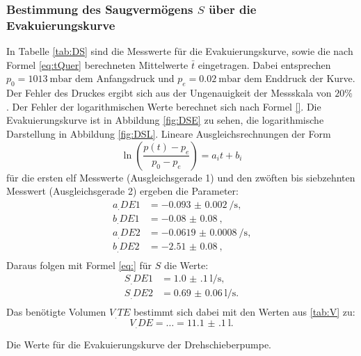 \subsubsection{Bestimmung des Saugvermögens $S$ über die Evakuierungskurve}

In Tabelle \ref{tab:DS} sind die Messwerte für die Evakuierungskurve, sowie die nach Formel \eqref{eq:tQuer} berechneten Mittelwerte $\bar{t}$ eingetragen.
Dabei entsprechen $p_0=\SI{1013}{\milli\bar}$ dem Anfangsdruck und $p_e=\SI{0.02}{\milli\bar}$ dem Enddruck der Kurve. Der Fehler des Druckes ergibt sich aus der Ungenauigkeit der Messskala von $20\%$ \cite{V70}. 
Der Fehler der logarithmischen Werte berechnet sich nach Formel \eqref{}.
Die Evakuierungskurve ist in Abbildung \ref{fig:DSE} zu sehen, die logarithmische Darstellung in Abbildung \ref{fig:DSL}.
Lineare Ausgleichsrechnungen der Form
\[
\ln\left(\frac{p(t)-p_e}{p_0-p_e}\right) = a_it+b_i
\]
für die ersten elf Messwerte (Ausgleichsgerade 1) und den zwöften bis siebzehnten Messwert (Ausgleichsgerade 2) ergeben die Parameter:
\begin{align*}
a_.{DE1} &= \SI{-0.093(2)}{\per\second} \text{,}\\
b_.{DE1} &= \SI{-0.08(8)}{} \text{,}\\
a_.{DE2} &= \SI{-0.0619(8)}{\per\second} \text{,}\\
b_.{DE2} &= \SI{-2.51(8)}{} \text{,}\\
\end{align*} 
Daraus folgen mit Formel \eqref{eq:} für $S$ die Werte:
\begin{align*}
S_.{DE1} &= \SI{1.0(1)}{\litre\per\second} \text{,}\\
S_.{DE2} &= \SI{0.69(6)}{\litre\per\second} \text{.}\\
\end{align*} 
Das benötigte Volumen $V_.{TE}$ bestimmt sich dabei mit den Werten aus \ref{tab:V} zu:
\[
V_.{DE} = \dots = \SI{11.1(1)}{\litre}\text{.}
\]

\begin{table}
\centering
\caption{Die Werte für die Evakuierungskurve der Drehschieberpumpe.}

\label{tab:DS}
\end{table}

